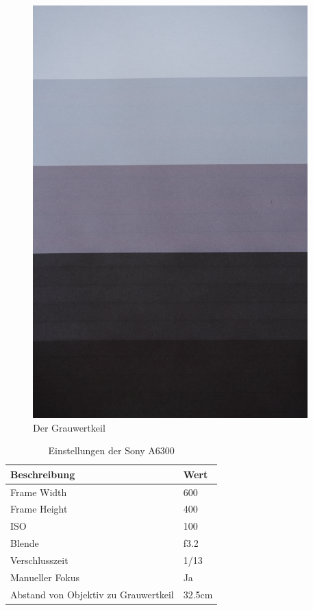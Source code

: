 \documentclass[12pt, oneside, a4paper, \docLanguage]{report}
\begin{document}
\begin{figure}[H]
	\centering\small
	\includegraphics[width=\textwidth, angle=90, scale=0.6]{media/original_versuch1.png}
	\caption{Der Grauwertkeil}
	\label{fig:VERSUCH_1_MESSWERTE_ORIGINAL}
\end{figure}

\begin{table}[H]
\begin{tabular}{|l|l|}
\hline
\textbf{Beschreibung}                & \textbf{Wert} \\ \hline
Frame Width							 & 600			 \\ \hline
Frame Height						 & 400			 \\ \hline
ISO                                  & 100           \\ \hline
Blende                               & f3.2          \\ \hline
Verschlusszeit                       & 1/13          \\ \hline
Manueller Fokus                      & Ja            \\ \hline
Abstand von Objektiv zu Grauwertkeil & 32.5cm        \\ \hline
\end{tabular}
\caption{Einstellungen der Sony A6300}
\label{fig:VERSUCH_1_MESSWERTE_TABELLE}
\end{table}
\end{document}
